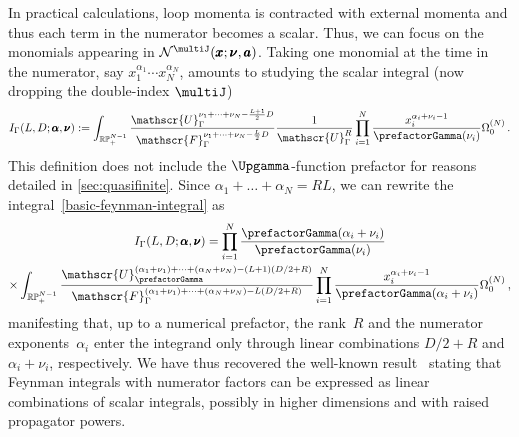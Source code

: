 \documentclass[12pt,a4paper]{article}
\theoremstyle{plain}
\theoremstyle{remark}
\newcommand{\nprops}{N}
\newcommand{\feynpar}{x}
\newcommand{\sumnus}{\nu_1+\dots+\nu_{\nprops}}
\newcommand{\undernotation}[1]{\pmb{#1}}
\begin{document}
       In practical calculations, loop momenta is contracted with external momenta and thus each term in the numerator becomes a scalar. Thus, we can focus on the monomials appearing in $\mathcal N^{\multiJ}(\undernotation{x};\undernotation{\nu},\undernotation {a})$. 
		Taking one monomial at the time in the numerator, say $x_1^{\alpha_1}\cdots x_\nprops^{\alpha_\nprops}$, amounts to studying  the scalar integral (now dropping the double-index $\multiJ$)
		\begin{equation}
			I_\Gamma (L, D; \undernotation{\alpha},\undernotation{\nu}) :=   	\int_{\mathbb R\mathbb P_+^{\nprops-1}} {\mathscr{U}_\Gamma^{\sumnus-{L+1\over2}D}\over
				\mathscr{F}_\Gamma^{\sumnus-{L\over2}D}}{1\over \mathscr{U}_\Gamma^R}
			\prod_{i=1}^{\nprops}
			{\feynpar_i^{\alpha_i+\nu_i-1}\over\prefactorGamma(\nu_i) }  \Omega_0^{(\nprops)} \, .
			\label{basic-feynman-integral}
		\end{equation}
		This definition does not include the $\Upgamma$-function prefactor for reasons detailed in \cref{sec:quasifinite}.
		Since $\alpha_1 + \dots + \alpha_\nprops = RL$, we can rewrite the integral~\eqref{basic-feynman-integral} as
		\begin{multline}
			I_\Gamma (L, D; \undernotation{\alpha}, \undernotation{\nu}) =
			\prod_{i=1}^\nprops \frac{\prefactorGamma(\alpha_i + \nu_i)}{\prefactorGamma(\nu_i)} \\
            \times
			\int_{\mathbb R\mathbb P_+^{\nprops-1}} {\mathscr{U}_\prefactorGamma^{(\alpha_1+\nu_1) + \dots + (\alpha_\nprops + \nu_\nprops) - (L+1)(D/2+R)}\over
				\mathscr{F}_\Gamma^{(\alpha_1+\nu_1) + \dots + (\alpha_\nprops + \nu_\nprops) - L(D/2+R)}}
			\prod_{i=1}^{\nprops}
			{\feynpar_i^{\alpha_i+\nu_i-1}\over\prefactorGamma(\alpha_i + \nu_i) }  \Omega_0^{(\nprops)} \, ,
		\end{multline}
		manifesting that, up to a numerical prefactor, the rank~$R$ and the numerator exponents~$\alpha_i$ enter the integrand only through linear combinations $D/2+R$ and $\alpha_i + \nu_i$, respectively. We have thus recovered the well-known result~\cite{Tarasov:1996br} stating that Feynman integrals with numerator factors can be expressed as linear combinations of scalar integrals, possibly in higher dimensions and with raised propagator powers.
        
\end{document}
